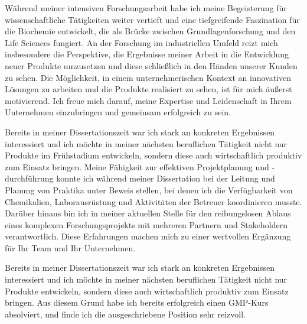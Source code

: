     {Während meiner intensiven Forschungsarbeit habe ich meine Begeisterung für wissenschaftliche Tätigkeiten weiter vertieft und eine tiefgreifende Faszination für die Biochemie entwickelt, die als Brücke zwischen Grundlagenforschung und den Life Sciences fungiert. An der Forschung im industriellen Umfeld reizt mich insbesondere die Perspektive, die Ergebnisse meiner Arbeit in die Entwicklung neuer Produkte umzusetzen und diese schließlich in den Händen unserer Kunden zu sehen. Die Möglichkeit, in einem unternehmerischen Kontext an innovativen Lösungen zu arbeiten und die Produkte realisiert zu sehen, ist für mich äußerst motivierend. Ich freue mich darauf, meine Expertise und Leidenschaft in Ihrem Unternehmen einzubringen und gemeinsam erfolgreich zu sein.}{}
    {Bereits in meiner Dissertationszeit war ich stark an konkreten Ergebnissen interessiert und ich möchte in meiner nächsten beruflichen Tätigkeit nicht nur Produkte im Frühstadium entwickeln, sondern diese auch wirtschaftlich produktiv zum Einsatz bringen. Meine Fähigkeit zur effektiven Projektplanung und -durchführung konnte ich während meiner Dissertation bei der Leitung und Planung von Praktika unter Beweis stellen, bei denen ich die Verfügbarkeit von Chemikalien, Laborausrüstung und Aktivitäten der Betreuer koordinieren musste. Darüber hinaus bin ich in meiner aktuellen Stelle für den reibungslosen Ablaus eines komplexen Forschungsprojekts mit mehreren Partnern und Stakeholdern verantwortlich. Diese Erfahrungen machen mich zu einer wertvollen Ergänzung für Ihr Team und Ihr Unternehmen.
    \par }{}
    {Bereits in meiner Dissertationszeit war ich stark an konkreten Ergebnissen interessiert und ich möchte in meiner nächsten beruflichen Tätigkeit nicht nur Produkte entwickeln, sondern diese auch wirtschaftlich produktiv zum Einsatz bringen. Aus diesem Grund habe ich bereits erfolgreich einen GMP-Kurs absolviert, und finde ich die ausgeschriebene Position sehr reizvoll.\par }{}

